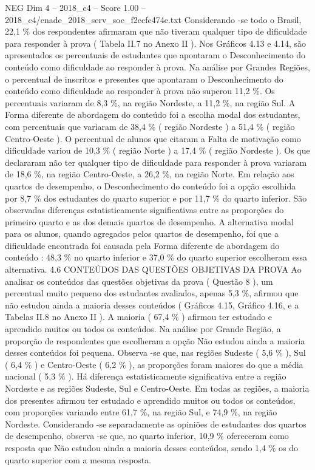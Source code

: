 \begin{textsample}{NEG Dim 4 – 2018\_c4 – Score 1.00 – 2018\_c4/enade\_2018\_serv\_soc\_f2ecfc474e.txt}
Considerando -se todo o Brasil, 22,1 \% dos respondentes afirmaram que não tiveram qualquer tipo de dificuldade para responder à prova ( Tabela II.7 no Anexo II ).
Nos Gráficos 4.13 e 4.14, são apresentados os percentuais de estudantes que apontaram o Desconhecimento do conteúdo como dificuldade ao responder à prova.
Na análise por Grandes Regiões, o percentual de inscritos e presentes que apontaram o Desconhecimento do conteúdo como dificuldade ao responder à prova não superou 11,2 \%.
Os percentuais variaram de 8,3 \%, na região Nordeste, a 11,2 \%, na região Sul.
A Forma diferente de abordagem do conteúdo foi a escolha modal dos estudantes, com percentuais que variaram de 38,4 \% ( região Nordeste ) a 51,4 \% ( região Centro-Oeste ).
O percentual de alunos que citaram a Falta de motivação como dificuldade variou de 10,3 \% ( região Norte ) a 17,4 \% ( região Nordeste ).
Os que declararam não ter qualquer tipo de dificuldade para responder à prova variaram de 18,6 \%, na região Centro-Oeste, a 26,2 \%, na região Norte.
Em relação aos quartos de desempenho, o Desconhecimento do conteúdo foi a opção escolhida por 8,7 \% dos estudantes do quarto superior e por 11,7 \% do quarto inferior.
São observadas diferenças estatisticamente significativas entre as proporções do primeiro quarto e as dos demais quartos de desempenho.
A alternativa modal para os alunos, quando agregados pelos quartos de desempenho, foi que a dificuldade encontrada foi causada pela Forma diferente de abordagem do conteúdo : 48,3 \% no quarto inferior e 37,0 \% do quarto superior escolheram essa alternativa. 4.6 CONTEÚDOS DAS QUESTÕES OBJETIVAS DA PROVA Ao analisar os conteúdos das questões objetivas da prova ( Questão 8 ), um percentual muito pequeno dos estudantes avaliados, apenas 5,3 \%, afirmou que não estudou ainda a maioria desses conteúdos ( Gráficos 4.15, Gráfico 4.16, e a Tabelas II.8 no Anexo II ).
A maioria ( 67,4 \% ) afirmou ter estudado e aprendido muitos ou todos os conteúdos.
Na análise por Grande Região, a proporção de respondentes que escolheram a opção Não estudou ainda a maioria desses conteúdos foi pequena.
Observa -se que, nas regiões Sudeste ( 5,6 \% ), Sul ( 6,4 \% ) e Centro-Oeste ( 6,2 \% ), as proporções foram maiores do que a média nacional ( 5,3 \% ).
Há diferença estatisticamente significativa entre a região Nordeste e as regiões Sudeste, Sul e Centro-Oeste.
Em todas as regiões, a maioria dos presentes afirmou ter estudado e aprendido muitos ou todos os conteúdos, com proporções variando entre 61,7 \%, na região Sul, e 74,9 \%, na região Nordeste.
Considerando -se separadamente as opiniões de estudantes dos quartos de desempenho, observa -se que, no quarto inferior, 10,9 \% ofereceram como resposta que Não estudou ainda a maioria desses conteúdos, sendo 1,4 \% os do quarto superior com a mesma resposta.

\end{textsample}
